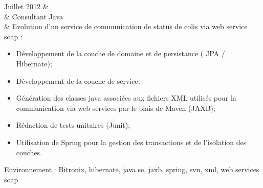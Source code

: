 Juillet 2012 	& \\
				& Consultant Java \\
                & Evolution d'un service de communication de status de colis via web service soap :%
				\begin{itemize}%
    				\item Développement de la couche de domaine et de persistance ( JPA / Hibernate);%
    				\item Développement de la couche de service;%
    				\item Génération des classes java associées aux fichiers XML utilisés pour la communication via web services par le biais de Maven (JAXB);%
    				\item Rédaction de tests unitaires (Junit);%
    				\item Utilisation de Spring pour la gestion des transactions et de l'isolation des couches.%
    			\end{itemize}%
Environnement : Bitronix, hibernate, java se, jaxb, spring, svn, xml, web services soap \\\\
